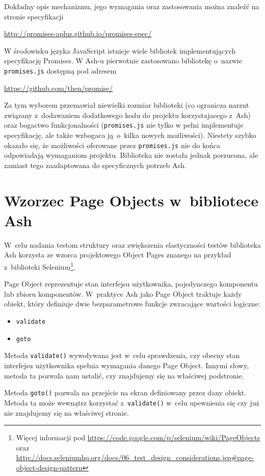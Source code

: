 \documentclass{xmgr}
\begin{document}
Dokładny opis mechanizmu, jego wymagania oraz zastosowania można znaleźć na  stronie specyfikacji

\url{http://promises-aplus.github.io/promises-spec/}

W środowisku języka JavaScript istnieje wiele bibliotek implementujących specyfikację Promises. W Ash-u pierwotnie zastosowano bibliotekę o~nazwie \texttt{promises.js} dostępną pod adresem

\url{https://github.com/then/promise/}

Za tym wyborem przemawiał niewielki rozmiar biblioteki (co ogranicza narzut związany z~dodawaniem dodatkowego kodu do projektu korzystajacego z~Ash) oraz bogactwo funkcjonalności (\texttt{promises.js} nie tylko w pełni implementuje specyfikację, ale także wzbogaca ją~o~kilka nowych możliwości). Niestety szybko okazało się, że możliwości oferowane przez \texttt{promises.js} nie do końca odpowiadają wymaganiom projektu. Biblioteka nie została jednak porzucona, ale zamiast tego zaadaptowana do specyficznych potrzeb Ash.  

\section{Wzorzec Page Objects w~bibliotece Ash}

W~celu nadania testom struktury oraz zwiększenia elastyczności testów biblioteka Ash korzysta ze wzorca projektowego Object Pages znanego na przykład z~biblioteki Selenium\footnote{ Więcej informacji pod \url{https://code.google.com/p/selenium/wiki/PageObjects} 
oraz 
\url{http://docs.seleniumhq.org/docs/06\_test\_design\_considerations.jsp\#page-object-design-pattern} }.

Page Object reprezentuje stan interfejsu użytkownika, pojedynczego komponentu lub zbioru komponentów. W~praktyce Ash jako Page Object traktuje każdy obiekt, który definiuje dwie bezparametrowe funkcje zwracające wartości logiczne:

\begin{itemize}
  \item \texttt{validate}
  \item \texttt{goto}
\end{itemize}

Metoda \texttt{validate()} wywoływana jest w~celu sprawdzenia, czy obecny stan interfejsu użytkownika spełnia wymagania danego Page Object. Innymi słowy, metoda ta pozwala nam ustalić, czy znajdujemy się na właściwej podstronie. 

Metoda \texttt{goto()} pozwala na przejście na ekran definiowany przez dany obiekt. Metoda ta może wewnątrz korzystać z~\texttt{validate()} w~celu upewnienia się czy już nie znajdujemy się na właściwej stronie. 
\end{document}
